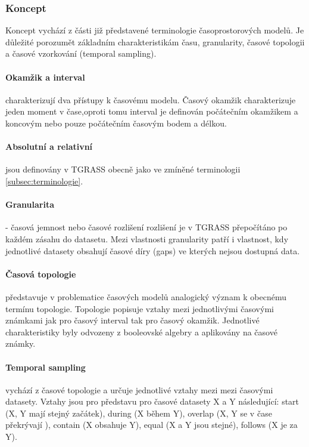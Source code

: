 \documentclass[a4paper,12pt,oneside]{report}
\begin{document}
\subsubsection{Koncept} 
Koncept vychází z části již představené terminologie časoprostorových modelů. Je důležité porozumět základním charakteristikám času, granularity, časové topologii a časové vzorkování (temporal sampling). 

\paragraph*{Okamžik a interval} charakterizují dva přístupy k časovému modelu.  Časový okamžik charakterizuje jeden moment v čase,oproti tomu interval je definován počátečním okamžikem a koncovým nebo pouze počátečním časovým bodem a délkou. 

\paragraph*{Absolutní a relativní} jsou definovány v TGRASS obecně jako ve zmíněné terminologii \ref{subsec:terminologie}.

\paragraph*{Granularita}- časová jemnost nebo časové rozlišení rozlišení je v TGRASS přepočítáno po každém zásahu do datasetu. Mezi vlastnosti granularity patří i vlastnost, kdy jednotlivé datasety  obsahují časové díry (gaps) ve kterých nejsou dostupná data.  


\paragraph*{Časová topologie}  představuje v problematice časových modelů analogický význam k obecnému termínu topologie. Topologie popisuje vztahy mezi jednotlivými časovými známkami jak pro časový interval tak pro časový okamžik. Jednotlivé charakteristiky byly odvozeny z booleovské algebry a aplikovány na časové známky.

\paragraph*{Temporal sampling} vychází  z časové topologie a určuje jednotlivé vztahy mezi mezi časovými datasety. Vztahy jsou pro představu  pro časové datasety X a Y  následující: start (X, Y mají stejný začátek), during (X během Y), overlap (X, Y se v čase překrývají ), contain (X obsahuje Y), equal (X a Y jsou stejné), follows (X je za Y).
\end{document}
